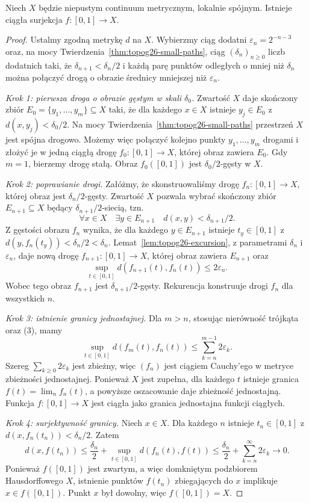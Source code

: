\begin{twierdzenie}
\label{thm:topog26-hm-sufficient}
Niech \(X\) będzie niepustym
continuum metrycznym, lokalnie spójnym.
Istnieje ciągła surjekcja
\(f\colon[0,1]\to X\).
\end{twierdzenie}
\begin{proof}
Ustalmy zgodną metrykę \(d\) na \(X\).
Wybierzmy ciąg dodatni
\(\varepsilon_n=2^{-n-3}\)
oraz, na mocy
Twierdzenia~\ref{thm:topog26-small-paths},
ciąg \((\delta_n)_{n\ge0}\) liczb dodatnich
taki, że
\(\delta_{n+1}<\delta_n/2\)
i każdą parę punktów
odległych o mniej niż \(\delta_n\)
można połączyć drogą
o obrazie średnicy mniejszej
niż \(\varepsilon_n\).

\emph{Krok 1: pierwsza droga o obrazie gęstym
w skali \(\delta_0\).}
Zwartość \(X\) daje
skończony zbiór
\(E_0=\{y_1,\ldots,y_m\}\subseteq X\)
taki, że dla każdego \(x\in X\)
istnieje \(y_j\in E_0\)
z \(d(x,y_j)<\delta_0/2\).
Na mocy
Twierdzenia~\ref{thm:topog26-small-paths}
przestrzeń \(X\) jest spójna drogowo.
Możemy więc połączyć kolejno
punkty \(y_1,\ldots,y_m\)
drogami i złożyć je w jedną
ciągłą drogę
\(f_0\colon[0,1]\to X\),
której obraz zawiera \(E_0\).
Gdy \(m=1\), bierzemy
drogę stałą.
Obraz \(f_0([0,1])\)
jest \(\delta_0/2\)-gęsty w \(X\).

\emph{Krok 2: poprawianie drogi.}
Załóżmy, że skonstruowaliśmy
drogę \(f_n\colon[0,1]\to X\),
której obraz jest
\(\delta_n/2\)-gęsty.
Zwartość \(X\) pozwala
wybrać skończony zbiór
\(E_{n+1}\subseteq X\)
będący \(\delta_{n+1}/2\)-siecią,
tzn.
\[
 \forall x\in X\quad
 \exists y\in E_{n+1}\quad
 d(x,y)<\delta_{n+1}/2.
\]
Z gęstości obrazu \(f_n\)
wynika, że dla każdego
\(y\in E_{n+1}\) istnieje
\(t_y\in[0,1]\)
z \(d(y,f_n(t_y))<\delta_n/2<\delta_n\).
Lemat~\ref{lem:topog26-excursion},
z parametrami \(\delta_n\)
i \(\varepsilon_n\),
daje nową drogę
\(f_{n+1}\colon[0,1]\to X\),
której obraz zawiera
\(E_{n+1}\) oraz
\[
 \sup_{t\in[0,1]}
 d(f_{n+1}(t),f_n(t))
 \le2\varepsilon_n.
 \tag{3}
\]
Wobec tego obraz \(f_{n+1}\)
jest \(\delta_{n+1}/2\)-gęsty.
Rekurencja konstruuje
drogi \(f_n\) dla wszystkich \(n\).

\emph{Krok 3: istnienie granicy jednostajnej.}
Dla \(m>n\), stosując nierówność
trójkąta oraz (3), mamy
\[
 \sup_{t\in[0,1]}d(f_m(t),f_n(t))
 \le \sum_{k=n}^{m-1}2\varepsilon_k.
\]
Szereg \(\sum_{k\ge0}2\varepsilon_k\)
jest zbieżny, więc \((f_n)\)
jest ciągiem Cauchy'ego
w metryce zbieżności jednostajnej.
Ponieważ \(X\) jest zupełna,
dla każdego \(t\) istnieje
granica \(f(t)=\lim_n f_n(t)\),
a powyższe oszacowanie
daje zbieżność jednostajną.
Funkcja \(f\colon[0,1]\to X\)
jest ciągła jako granica
jednostajna funkcji ciągłych.

\emph{Krok 4: surjektywność granicy.}
Niech \(x\in X\).
Dla każdego \(n\) istnieje
\(t_n\in[0,1]\) z
\(d(x,f_n(t_n))<\delta_n/2\).
Zatem
\[
 d(x,f(t_n))
 \le \frac{\delta_n}{2}
  +\sup_{t\in[0,1]}d(f_n(t),f(t))
 \le \frac{\delta_n}{2}
  +\sum_{k=n}^{\infty}2\varepsilon_k
 \longrightarrow0.
\]
Ponieważ \(f([0,1])\)
jest zwartym, a więc domkniętym
podzbiorem Hausdorffowego \(X\),
istnienie punktów \(f(t_n)\)
zbiegających do \(x\)
implikuje \(x\in f([0,1])\).
Punkt \(x\) był dowolny,
więc \(f([0,1])=X\).
\end{proof}

